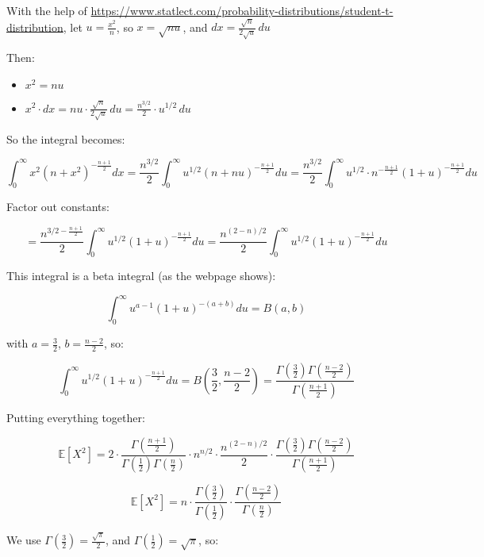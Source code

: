 \documentclass{article}
\begin{document}
With the help of
\url{https://www.statlect.com/probability-distributions/student-t-distribution},
let \( u = \frac{x^2}{n} \), so \( x = \sqrt{n u} \), and \( dx = \frac{\sqrt{n}}{2\sqrt{u}}\, du \)

Then:
\begin{itemize}
    \item \( x^2 = n u \)
    \item \( x^2 \cdot dx = n u \cdot \frac{\sqrt{n}}{2\sqrt{u}} \, du = \frac{n^{3/2}}{2} \cdot u^{1/2} \, du \)
\end{itemize}

So the integral becomes:

\[
    \int_0^\infty x^2 (n + x^2)^{-\frac{n+1}{2}} dx
    = \frac{n^{3/2}}{2} \int_0^\infty u^{1/2} (n + n u)^{-\frac{n+1}{2}} du
    = \frac{n^{3/2}}{2} \int_0^\infty u^{1/2} \cdot n^{-\frac{n+1}{2}} (1 + u)^{-\frac{n+1}{2}} du
\]

Factor out constants:

\[
    = \frac{n^{3/2 - \frac{n+1}{2}}}{2} \int_0^\infty u^{1/2} (1 + u)^{-\frac{n+1}{2}} du
    = \frac{n^{(2 - n)/2}}{2} \int_0^\infty u^{1/2} (1 + u)^{-\frac{n+1}{2}} du
\]

This integral is a beta integral (as the webpage shows):

\[
    \int_0^\infty u^{a - 1} (1 + u)^{-(a + b)} du = B(a, b)
\]

with \( a = \frac{3}{2} \), \( b = \frac{n - 2}{2} \), so:

\[
    \int_0^\infty u^{1/2} (1 + u)^{-\frac{n+1}{2}} du = B\left( \frac{3}{2}, \frac{n - 2}{2} \right)
    = \frac{\Gamma\left( \frac{3}{2} \right) \Gamma\left( \frac{n - 2}{2} \right)}{\Gamma\left( \frac{n + 1}{2} \right)}
\]

Putting everything together:

\[
    \mathbb{E}[X^2] =
    2 \cdot \frac{\Gamma\left( \frac{n+1}{2} \right)}{\Gamma\left( \frac{1}{2} \right)\Gamma\left( \frac{n}{2} \right)}
    \cdot n^{n/2} \cdot \frac{n^{(2 - n)/2}}{2}
    \cdot \frac{\Gamma\left( \frac{3}{2} \right) \Gamma\left( \frac{n - 2}{2} \right)}{\Gamma\left( \frac{n + 1}{2} \right)}
\]


\[
    \mathbb{E}[X^2] = n \cdot \frac{\Gamma\left( \frac{3}{2} \right)}{\Gamma\left( \frac{1}{2} \right)}
    \cdot \frac{\Gamma\left( \frac{n - 2}{2} \right)}{\Gamma\left( \frac{n}{2} \right)}
\]

We use \( \Gamma\left( \frac{3}{2} \right) = \frac{\sqrt{\pi}}{2} \), and \( \Gamma\left( \frac{1}{2} \right) = \sqrt{\pi} \), so:
\end{document}
